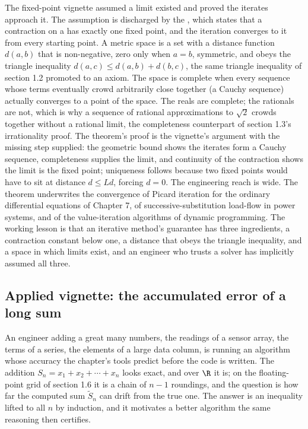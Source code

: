 \begin{mastery}
The fixed-point vignette assumed a limit existed and proved the iterates
approach it. The assumption is discharged by the , which states that a contraction on a
 has exactly one fixed point, and the
iteration converges to it from every starting point. A metric space is a
set with a distance function $d(a, b)$ that is non-negative, zero only
when $a = b$, symmetric, and obeys the triangle inequality $d(a, c) \leq
d(a, b) + d(b, c)$, the same triangle inequality of section 1.2 promoted
to an axiom. The space is complete when every sequence whose terms
eventually crowd arbitrarily close together (a Cauchy sequence) actually
converges to a point of the space. The reals are complete; the rationals
are not, which is why a sequence of rational approximations to $\sqrt 2$
crowds together without a rational limit, the completeness counterpart of
section 1.3's irrationality proof. The theorem's proof is the vignette's
argument with the missing step supplied: the geometric bound shows the
iterates form a Cauchy sequence, completeness supplies the limit, and
continuity of the contraction shows the limit is the fixed point;
uniqueness follows because two fixed points would have to sit at distance
$d \leq L d$, forcing $d = 0$. The engineering reach is wide. The theorem
underwrites the convergence of Picard iteration for the ordinary
differential equations of Chapter 7, of successive-substitution load-flow
in power systems, and of the value-iteration algorithms of dynamic
programming. The working lesson is that an iterative method's guarantee
has three ingredients, a contraction constant below one, a distance that
obeys the triangle inequality, and a space in which limits exist, and an
engineer who trusts a solver has implicitly assumed all three.
\end{mastery}

\subsection{Applied vignette: the accumulated error of a long sum}

An engineer adding a great many numbers, the readings of a sensor array,
the terms of a series, the elements of a large data column, is running an
algorithm whose accuracy the chapter's tools predict before the code is
written. The addition $S_{n} = x_{1} + x_{2} + \cdots + x_{n}$ looks
exact, and over $\R$ it is; on the floating-point grid of section 1.6 it
is a chain of $n - 1$ roundings, and the question is how far the computed
sum $\tilde S_{n}$ can drift from the true one. The answer is an
inequality lifted to all $n$ by induction, and it motivates a better
algorithm the same reasoning then certifies.

